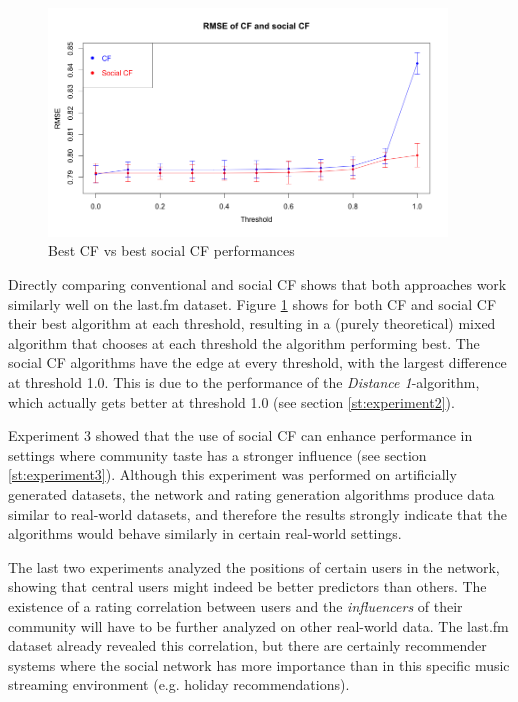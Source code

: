 \begin{figure}[!h]
\includegraphics[width=400px]{./4-experiments/figures/CFvsSocialCF_01.png}
\caption{Best CF vs best social CF performances}
\label{f:cfvssocialcf}
\end{figure}

Directly comparing conventional and social CF shows that both approaches work similarly well on the last.fm dataset. Figure \ref{f:cfvssocialcf} shows for both CF and social CF their best algorithm at each threshold, resulting in a (purely theoretical) mixed algorithm that chooses at each threshold the algorithm performing best. The social CF algorithms have the edge at every threshold, with the largest difference at threshold 1.0. This is due to the performance of the \textit{Distance 1}-algorithm, which actually gets better at threshold 1.0 (see section \ref{st:experiment2}).
\newline

Experiment 3 showed that the use of social CF can enhance performance in settings where community taste has a stronger influence (see section \ref{st:experiment3}). Although this experiment was performed on artificially generated datasets, the network and rating generation algorithms produce data similar to real-world datasets, and therefore the results strongly indicate that the algorithms would behave similarly in certain real-world settings.
\newline

The last two experiments analyzed the positions of certain users in the network, showing that central users might indeed be better predictors than others. The existence of a rating correlation between users and the \textit{influencers} of their community will have to be further analyzed on other real-world data. The last.fm dataset already revealed this correlation, but there are certainly recommender systems where the social network has more importance than in this specific music streaming environment (e.g. holiday recommendations).